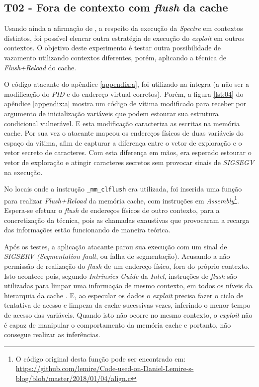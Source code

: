 \documentclass[
	article,			    %
	12pt,				    %
	oneside,			    %
	a4paper,			    %
	chapter=TITLE,		    %
	section=TITLE,		    %
	subsection=TITLE,	    %
	english,			    %
	brazil,				    %
	sumario=tradicional
]{abntex2}
\begin{document}
\subsection{T02 - Fora de contexto com \emph{flush} da cache}
Usando ainda a afirmação de , a respeito da execução da \emph{Spectre} em contextos distintos, foi possível elencar outra estratégia de execução do \emph{exploit} em outros contextos. O objetivo deste experimento é testar outra possibilidade de vazamento utilizando contextos diferentes, porém, aplicando a técnica de \emph{Flush+Reload} do cache.

O código atacante do apêndice \ref{appendix:a}, foi utilizado na íntegra (a não ser a modificação do \emph{PID} e do endereço virtual corretos). Porém, a figura \ref{lst:04} do apêndice \ref{appendix:a} mostra um código de vítima modificado para receber por argumento de inicialização variáveis que podem estourar sua estrutura condicional vulnerável. E esta modificação caracteriza as escritas na memória cache. Por sua vez o atacante mapeou os endereços físicos de duas variáveis do espaço da vítima, afim de capturar a diferença entre o vetor de exploração e o vetor secreto de caracteres. Com esta diferença em mãos, era esperado estourar o vetor de exploração e atingir caracteres secretos sem provocar sinais de \emph{SIGSEGV} na execução.

No locais onde a instrução \lstinline[language=C, style=c]{_mm_clflush} era utilizada, foi inserida uma função para realizar \emph{Flush+Reload} da memória cache, com instruções em \emph{Assembly}\footnote{O código original desta função pode ser encontrado em: \url{https://github.com/lemire/Code-used-on-Daniel-Lemire-s-blog/blob/master/2018/01/04/align.c}}. Espera-se efetuar o \emph{flush} de endereços físicos de outro contexto, para a concretização da técnica, pois as chamadas exaustivas que provocaram a recarga das informações estão funcionando de maneira teórica.

Após os testes, a aplicação atacante parou sua execução com um sinal de \emph{SIGSERV (Segmentation fault}, ou falha de segmentação). Acusando a não permissão de realização do \emph{flush} de um endereço físico, fora do próprio contexto. Isto acontece pois, segundo \emph{Intrinsics Guide} da \emph{Intel}, instruções de \emph{flush} são utilizadas para limpar uma informação de mesmo contexto, em todos os níveis da hierarquia da cache \cite{Intel2018Intrinsics}. E, ao especular os dados o \emph{exploit} precisa fazer o ciclo de tentativa de acesso e limpeza da cache sucessivas vezes, inferindo o menor tempo de acesso das variáveis. Quando isto não ocorre no mesmo contexto, o \emph{exploit} não é capaz de manipular o comportamento da memória cache e portanto, não consegue realizar as inferências.
\end{document}

